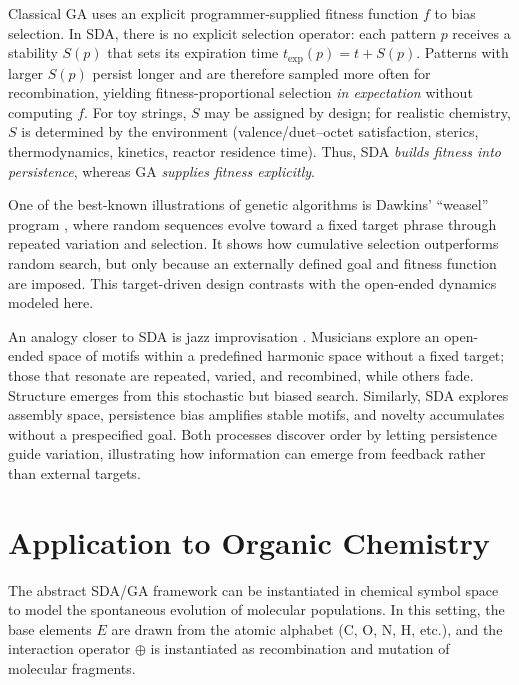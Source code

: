 \documentclass[life,article,submit,pdftex,moreauthors]{Definitions/mdpi}
\begin{document}
Classical GA uses an explicit programmer-supplied fitness function $f$ to bias selection. 
In SDA, there is no explicit selection operator: each pattern $p$ receives a stability 
$S(p)$ that sets its expiration time $t_{\exp}(p)=t+S(p)$. Patterns with larger $S(p)$ 
persist longer and are therefore sampled more often for recombination, yielding 
fitness-proportional selection \emph{in expectation} without computing $f$. 
For toy strings, $S$ may be assigned by design; for realistic chemistry, $S$ is determined 
by the environment (valence/duet–octet satisfaction, sterics, thermodynamics, kinetics, 
reactor residence time). Thus, SDA \emph{builds fitness into persistence}, whereas GA 
\emph{supplies fitness explicitly}.

One of the best-known illustrations of genetic algorithms is Dawkins’ 
“weasel” program \cite{dawkins1986blind}, where random sequences evolve 
toward a fixed target phrase through repeated variation and selection. 
It shows how cumulative selection outperforms random search, but only 
because an externally defined goal and fitness function are imposed. 
This target-driven design contrasts with the open-ended dynamics modeled 
here.  

An analogy closer to SDA is jazz improvisation \cite{adler2025jazz}. 
Musicians explore an open-ended space of motifs within a predefined harmonic space
without a fixed target; 
those that resonate are repeated, varied, and recombined, while others
fade. Structure emerges from this stochastic but biased search. 
Similarly, SDA explores assembly space, persistence bias amplifies 
stable motifs, and novelty accumulates without a prespecified goal. 
Both processes discover order by letting persistence guide variation, 
illustrating how information can emerge from feedback rather than 
external targets.


\section{Application to Organic Chemistry}

The abstract SDA/GA framework can be instantiated in chemical symbol space to model 
the spontaneous evolution of molecular populations. In this setting, the base elements 
$E$ are drawn from the atomic alphabet (C, O, N, H, etc.), and the interaction operator 
$\oplus$ is instantiated as recombination and mutation of molecular fragments. 
\end{document}
